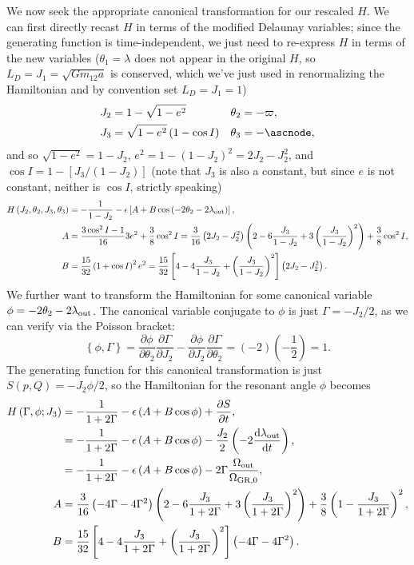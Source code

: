 \documentclass[10pt,
        usenames, %
        dvipsnames %
    ]{article}
\newcommand*{\rd}[2]{\frac{\mathrm{d}#1}{\mathrm{d}#2}}
\newcommand*{\pd}[2]{\frac{\partial#1}{\partial#2}}
\newcommand*{\p}[1]{\left(#1\right)}
\newcommand*{\s}[1]{\left[#1\right]}
\newcommand*{\z}[1]{\left\{#1\right\}}
\begin{document}
We now seek the appropriate canonical transformation for our rescaled $H$. We
can first directly recast $H$ in terms of the modified Delaunay variables; since
the generating function is time-independent, we just need to re-express $H$ in
terms of the new variables ($\theta_1 = \lambda$ does not appear in the original
$H$, so $L_D = J_1 = \sqrt{Gm_{12}a}$ is conserved, which we've just used in
renormalizing the Hamiltonian and by convention set $L_D = J_1 = 1$)
\begin{align}
    J_2 &= 1 - \sqrt{1 - e^2} & \theta_2 &= -\varpi,\\
    J_3 &= \sqrt{1 - e^2}\p{1 - \cos I} & \theta_3 &= -\ascnode,
\end{align}
and so $\sqrt{1 - e^2} = 1 - J_2$, $e^2 = 1 - \p{1 - J_2}^2 = 2J_2 - J_2^2$, and
$\cos I = 1 - \s{J_3 / \p{1 - J_2}}$ (note that $J_3$ is also a constant, but
since $e$ is not constant, neither is $\cos I$, strictly speaking)
\begin{align}
    H\p{J_2, \theta_2, J_3, \theta_3}
        &= -\frac{1}{1 - J_2} - \epsilon\s{
            A + B \cos\p{-2\theta_2 - 2\lambda_{\rm out}}
        },\\
    A &= \frac{3\cos^2 I - 1}{16}3e^2 + \frac{3}{8}\cos^2 I =
        \frac{3}{16}\p{2J_2 - J_2^2}\p{
            2 - 6\frac{J_3}{1 - J_2} + 3\p{\frac{J_3}{1 - J_2}}^2}
            + \frac{3}{8}\cos^2 I,\\
    B &= \frac{15}{32}\p{1 + \cos I}^2e^2 =
        \frac{15}{32}\s{4 - 4\frac{J_3}{1 - J_2} + \p{\frac{J_3}{1 - J_2}}^2}
            \p{2J_2 - J_2^2}.
\end{align}
We further want to transform the Hamiltonian for some canonical variable $\phi =
-2\theta_2 - 2\lambda_{\rm out}$. The canonical variable conjugate to $\phi$ is
just $\Gamma = -J_2 / 2$, as we can verify via the Poisson bracket:
\begin{equation}
    \z{\phi, \Gamma} = \pd{\phi}{\theta_2}\pd{\Gamma}{J_2}
            - \pd{\phi}{J_2}\pd{\Gamma}{\theta_2}
        = \p{-2}\p{-\frac{1}{2}} = 1.
\end{equation}
The generating function for this canonical transformation is just $S\p{p, Q} =
-J_2\phi / 2$, so the Hamiltonian for the resonant angle $\phi$ becomes
\begin{align}
    H\p{\Gamma, \phi; J_3} &= -\frac{1}{1 + 2\Gamma} - \epsilon\p{
        A + B \cos \phi} + \pd{S}{t},\\
        &= -\frac{1}{1 + 2\Gamma} - \epsilon\p{
            A + B \cos \phi} - \frac{J_2}{2} \p{-2\rd{\lambda_{\rm out}}{t}},\\
        &= -\frac{1}{1 + 2\Gamma} - \epsilon\p{
            A + B \cos \phi} - 2\Gamma \frac{\Omega_{\rm out}}{\Omega_{\rm GR, 0}},\\
    A &= \frac{3}{16}\p{-4\Gamma - 4\Gamma^2}\p{
        2 - 6\frac{J_3}{1 + 2\Gamma} + 3\p{\frac{J_3}{1 + 2\Gamma}}^2}
        + \frac{3}{8}\p{1 - \frac{J_3}{1 + 2\Gamma}}^2,\\
    B &= \frac{15}{32}\s{
        4 - 4\frac{J_3}{1 + 2\Gamma} + \p{\frac{J_3}{1 + 2\Gamma}}^2}
        \p{-4\Gamma - 4\Gamma^2}.
\end{align}
\end{document}
